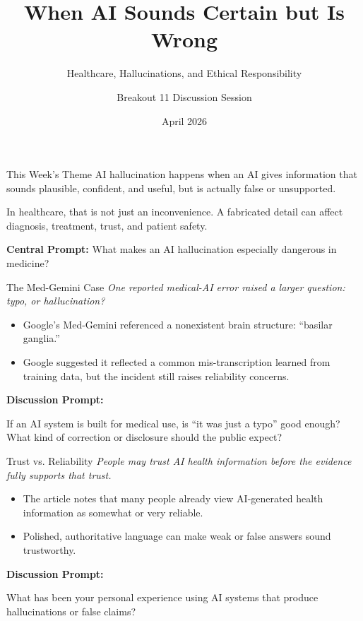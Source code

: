 \documentclass[aspectratio=169]{beamer}
\title{When AI Sounds Certain but Is Wrong}
\subtitle{Healthcare, Hallucinations, and Ethical Responsibility}
\author{Breakout 11 Discussion Session}
\date{April 2026}
\begin{document}
\begin{frame}
\titlepage
\end{frame}

\begin{frame}[t]{This Week's Theme}
\large
AI hallucination happens when an AI gives information that sounds plausible, confident, and useful, but is actually false or unsupported.

\vspace{0.3cm}
In healthcare, that is not just an inconvenience. A fabricated detail can affect diagnosis, treatment, trust, and patient safety.

\vfill
\textbf{\textcolor{UGARed}{Central Prompt:}}
What makes an AI hallucination especially dangerous in medicine?

\end{frame}

\begin{frame}[t]{The Med-Gemini Case}
\large
\textit{One reported medical-AI error raised a larger question: typo, or hallucination?}

\vspace{0.3em}

\begin{itemize}
\item Google's Med-Gemini referenced a nonexistent brain structure: ``basilar ganglia.''
\vspace{0.3em}
\item Google suggested it reflected a common mis-transcription learned from training data, but the incident still raises reliability concerns.
\end{itemize}
\vfill
\textbf{\textcolor{UGARed}{Discussion Prompt:}}

If an AI system is built for medical use, is ``it was just a typo'' good enough? What kind of correction or disclosure should the public expect?
\end{frame}

\begin{frame}[t]{Trust vs. Reliability}
\large
\textit{People may trust AI health information before the evidence fully supports that trust.}

\vspace{0.3em}

\begin{itemize}
\item The article notes that many people already view AI-generated health information as somewhat or very reliable.
\vspace{0.3em}
\item Polished, authoritative language can make weak or false answers sound trustworthy.
\end{itemize}
\vfill
\textbf{\textcolor{UGARed}{Discussion Prompt:}}

What has been your personal experience using AI systems that produce hallucinations or false claims?

\end{frame}
\end{document}
